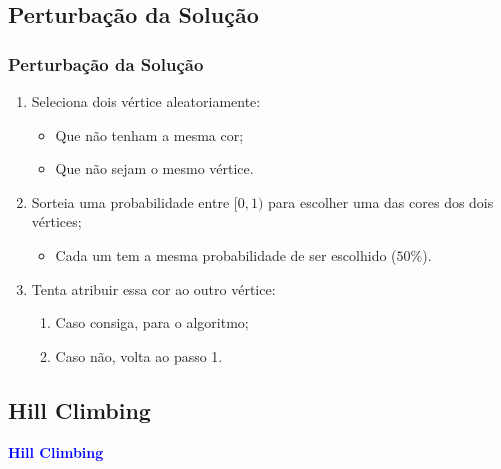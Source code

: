 \documentclass[compress, hide notes]{beamer}
\let\olditem=\item%
\renewcommand{\item}{\olditem \justifying}%
\begin{document}
 
 
 
 \subsection{Perturbação da Solução}
 
 \begin{frame}
 \frametitle{Perturbação da Solução}
 
 \begin{enumerate}
 \item Seleciona dois vértice aleatoriamente:
 \begin{itemize}
 \item Que não tenham a mesma cor;
 
 \bigskip
 
 \item Que não sejam o mesmo vértice.
 \end{itemize}
 
 \bigskip
 \bigskip
 
 \item Sorteia uma probabilidade entre $[0,1)$ para escolher uma das cores dos dois vértices;
 \begin{itemize}
 \item Cada um tem a mesma probabilidade de ser escolhido ($50 \%$).
 \end{itemize}
 
 \bigskip
 \bigskip
 
 \item Tenta atribuir essa cor ao outro vértice:
 \begin{enumerate}
 \item Caso consiga, para o algoritmo;
 
 \bigskip
 
 \item Caso não, volta ao passo 1.
 \end{enumerate}
 \end{enumerate}
 
 \end{frame}




 \subsection{Hill Climbing}
 
 			\begin{frame}
				\centering
				{
					\Huge 
					\textcolor{blue}{\textbf{Hill Climbing}}
				}
			\end{frame}
 
\end{document}
